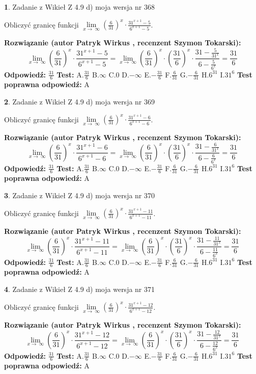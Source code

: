 \documentclass[12pt, a4paper]{article}
\theoremstyle{definition} %
\newtheorem{zad}{}
\newcommand{\zadStart}[1]{\begin{zad}#1\newline}
\newcommand{\zadStop}{\end{zad}}
\newcommand{\rozwStart}[2]{\noindent \textbf{Rozwiązanie (autor #1 , recenzent #2): }\newline}
\newcommand{\rozwStop}{\newline}
\newcommand{\odpStart}{\noindent \textbf{Odpowiedź:}\newline}
\newcommand{\odpStop}{\newline}
\newcommand{\testStart}{\noindent \textbf{Test:}\newline}
\newcommand{\testStop}{\newline}
\newcommand{\kluczStart}{\noindent \textbf{Test poprawna odpowiedź:}\newline}
\newcommand{\kluczStop}{\newline}
\begin{document}
\zadStart{Zadanie z Wikieł Z 4.9 d) moja wersja nr 368}


Obliczyć granicę funkcji  $\lim\limits_{x\to\ \infty}(\frac{6}{31})^{x}\cdot\frac{31^{x+1}-5}{6^{x+1}-5}$.
\zadStop
\rozwStart{Patryk Wirkus}{Szymon Tokarski}
$$\lim\limits_{x\to\ \infty}(\frac{6}{31})^{x}\cdot\frac{31^{x+1}-5}{6^{x+1}-5}=\lim\limits_{x\to\ \infty}(\frac{6}{31})^{x}\cdot(\frac{31}{6})^{x} \cdot \frac{31-\frac{5}{31^{x}}}{6-\frac{5}{6^{x}}} = \frac{31}{6}$$
\rozwStop
\odpStart
$\frac{31}{6}$
\odpStop
\testStart
A.$\frac{31}{6}$ B.$\infty$ C.$0$ D.$-\infty$ E.$-\frac{31}{6}$
F.$\frac{6}{31}$ G.$-\frac{6}{31}$
H.$6^{31}$
I.$31^{6}$
\testStop
\kluczStart
A
\kluczStop



\zadStart{Zadanie z Wikieł Z 4.9 d) moja wersja nr 369}


Obliczyć granicę funkcji  $\lim\limits_{x\to\ \infty}(\frac{6}{31})^{x}\cdot\frac{31^{x+1}-6}{6^{x+1}-6}$.
\zadStop
\rozwStart{Patryk Wirkus}{Szymon Tokarski}
$$\lim\limits_{x\to\ \infty}(\frac{6}{31})^{x}\cdot\frac{31^{x+1}-6}{6^{x+1}-6}=\lim\limits_{x\to\ \infty}(\frac{6}{31})^{x}\cdot(\frac{31}{6})^{x} \cdot \frac{31-\frac{6}{31^{x}}}{6-\frac{6}{6^{x}}} = \frac{31}{6}$$
\rozwStop
\odpStart
$\frac{31}{6}$
\odpStop
\testStart
A.$\frac{31}{6}$ B.$\infty$ C.$0$ D.$-\infty$ E.$-\frac{31}{6}$
F.$\frac{6}{31}$ G.$-\frac{6}{31}$
H.$6^{31}$
I.$31^{6}$
\testStop
\kluczStart
A
\kluczStop



\zadStart{Zadanie z Wikieł Z 4.9 d) moja wersja nr 370}


Obliczyć granicę funkcji  $\lim\limits_{x\to\ \infty}(\frac{6}{31})^{x}\cdot\frac{31^{x+1}-11}{6^{x+1}-11}$.
\zadStop
\rozwStart{Patryk Wirkus}{Szymon Tokarski}
$$\lim\limits_{x\to\ \infty}(\frac{6}{31})^{x}\cdot\frac{31^{x+1}-11}{6^{x+1}-11}=\lim\limits_{x\to\ \infty}(\frac{6}{31})^{x}\cdot(\frac{31}{6})^{x} \cdot \frac{31-\frac{11}{31^{x}}}{6-\frac{11}{6^{x}}} = \frac{31}{6}$$
\rozwStop
\odpStart
$\frac{31}{6}$
\odpStop
\testStart
A.$\frac{31}{6}$ B.$\infty$ C.$0$ D.$-\infty$ E.$-\frac{31}{6}$
F.$\frac{6}{31}$ G.$-\frac{6}{31}$
H.$6^{31}$
I.$31^{6}$
\testStop
\kluczStart
A
\kluczStop



\zadStart{Zadanie z Wikieł Z 4.9 d) moja wersja nr 371}


Obliczyć granicę funkcji  $\lim\limits_{x\to\ \infty}(\frac{6}{31})^{x}\cdot\frac{31^{x+1}-12}{6^{x+1}-12}$.
\zadStop
\rozwStart{Patryk Wirkus}{Szymon Tokarski}
$$\lim\limits_{x\to\ \infty}(\frac{6}{31})^{x}\cdot\frac{31^{x+1}-12}{6^{x+1}-12}=\lim\limits_{x\to\ \infty}(\frac{6}{31})^{x}\cdot(\frac{31}{6})^{x} \cdot \frac{31-\frac{12}{31^{x}}}{6-\frac{12}{6^{x}}} = \frac{31}{6}$$
\rozwStop
\odpStart
$\frac{31}{6}$
\odpStop
\testStart
A.$\frac{31}{6}$ B.$\infty$ C.$0$ D.$-\infty$ E.$-\frac{31}{6}$
F.$\frac{6}{31}$ G.$-\frac{6}{31}$
H.$6^{31}$
I.$31^{6}$
\testStop
\kluczStart
A
\kluczStop
\end{document}
